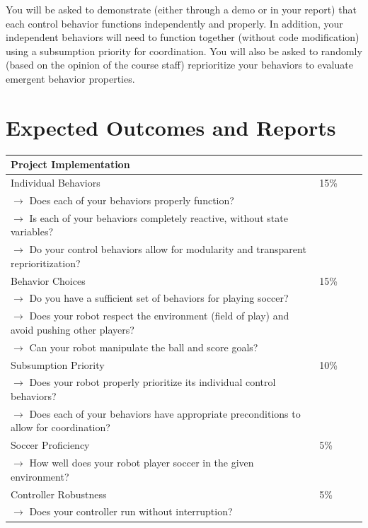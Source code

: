You will be asked to demonstrate (either through a demo or in your report) that each control behavior functions independently and properly.  In addition, your independent behaviors will need to function together (without code modification) using a subsumption priority for coordination.  You will also be asked to randomly (based on the opinion of the course staff) reprioritize your behaviors to evaluate emergent behavior properties.

\section{Expected Outcomes and Reports}

\vspace{1cm}
\begin{tabular}{|l|l||l|l|}
\hline
{\large \bf Project Implementation} & \\
\hline
\hline
Individual Behaviors & 15\% \\
$\rightarrow$ Does each of your behaviors properly function? & \\
$\rightarrow$ Is each of your behaviors completely reactive, without state variables? & \\
$\rightarrow$ Do your control behaviors allow for modularity and transparent reprioritization? & \\
\hline
Behavior Choices & 15\% \\
$\rightarrow$ Do you have a sufficient set of behaviors for playing soccer? & \\
$\rightarrow$ Does your robot respect the environment (field of play) and avoid pushing other players? & \\
$\rightarrow$ Can your robot manipulate the ball and score goals? & \\
\hline
Subsumption Priority & 10\% \\
$\rightarrow$ Does your robot properly prioritize its individual control behaviors? & \\
$\rightarrow$ Does each of your behaviors have appropriate preconditions to allow for coordination? & \\
\hline
Soccer Proficiency & 5\% \\
$\rightarrow$ How well does your robot player soccer in the given environment? & \\
\hline
Controller Robustness & 5\% \\
$\rightarrow$ Does your controller run without interruption? & \\
\hline
\end{tabular}



\newpage
